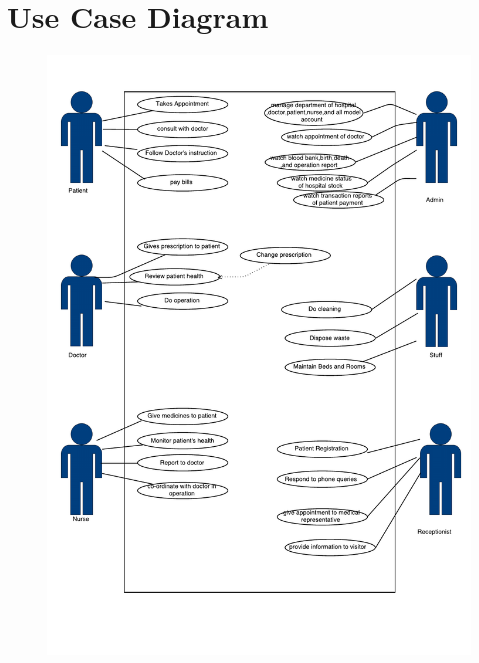 \documentclass[14pt]{article}
\begin{document}
\section{Use Case Diagram}
\begin{figure}[h!]
\centering
  \includegraphics[width=15cm]{hospitalDiagram1.pdf}
\end{figure}
\newpage
\end{document}
